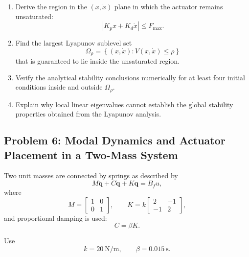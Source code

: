 \begin{enumerate}
    \item Derive the region in the $(x,\dot{x})$ plane in which the actuator
    remains unsaturated:
    \begin{equation}
    |K_px+K_d\dot{x}|
    \leq F_{\max}.
    \end{equation}

    \item Find the largest Lyapunov sublevel set
    \begin{equation}
    \Omega_\rho
    =
    \left\{
    (x,\dot{x}):
    V(x,\dot{x})\leq\rho
    \right\}
    \end{equation}
    that is guaranteed to lie inside the unsaturated region.

    \item Verify the analytical stability conclusions numerically for at
    least four initial conditions inside and outside $\Omega_\rho$.

    \item Explain why local linear eigenvalues cannot establish the global
    stability properties obtained from the Lyapunov analysis.
\end{enumerate}


\subsection*{Problem 6: Modal Dynamics and Actuator Placement in a Two-Mass System}

Two unit masses are connected by springs as described by
\begin{equation}
M\ddot{\mathbf{q}}
+
C\dot{\mathbf{q}}
+
K\mathbf{q}
=
B_fu,
\end{equation}
where
\begin{equation}
M=
\begin{bmatrix}
1&0\\
0&1
\end{bmatrix},
\qquad
K=
k
\begin{bmatrix}
2&-1\\
-1&2
\end{bmatrix},
\end{equation}
and proportional damping is used:
\begin{equation}
C=\beta K.
\end{equation}

Use
\begin{equation}
k=20~\mathrm{N/m},
\qquad
\beta=0.015~\mathrm{s}.
\end{equation}

